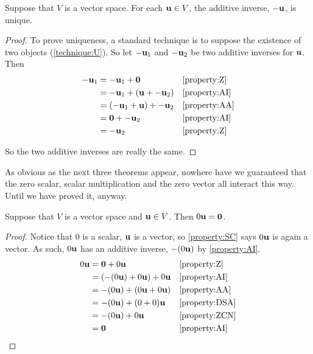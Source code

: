 \documentclass{ximera}
\begin{document}
\begin{theorem}
  \label{theorem:AIU}
  
  Suppose that $V$ is a vector space.   For each $\mathbf{u}\in V$, the additive inverse, $\mathbf{-u}$, is unique.
  
  \begin{proof}
    To prove uniqueness, a standard technique is to suppose the existence of two objects (\ref{technique:U}).  So let $\mathbf{-u}_1$ and $\mathbf{-u}_2$ be two additive inverses for $\mathbf{u}$.  Then
    \begin{align*}
      \mathbf{-u}_1&=\mathbf{-u}_1+\mathbf{0}&&\ref{property:Z}\\
                 &=\mathbf{-u}_1+(\mathbf{u}+\mathbf{-u}_2)&&\ref{property:AI}\\
                 &=(\mathbf{-u}_1+\mathbf{u})+\mathbf{-u}_2&&\ref{property:AA}\\
                 &=\mathbf{0}+\mathbf{-u}_2&&\ref{property:AI}\\
                 &=\mathbf{-u}_2&&\ref{property:Z}
    \end{align*}
    
    So the two additive inverses are really the same.
    
  \end{proof}
\end{theorem}

As obvious as the next three theorems appear, nowhere have we
guaranteed that the zero scalar, scalar multiplication and the zero
vector all interact this way.  Until we have proved it, anyway.

\begin{theorem}
  \label{theorem:ZSSM}

  Suppose that $V$ is a vector space and $\mathbf{u}\in V$.  Then $0\mathbf{u}=\mathbf{0}$.

  \begin{proof}
    Notice that $0$ is a scalar, $\mathbf{u}$ is a vector, so \ref{property:SC} says $0\mathbf{u}$ is again a vector.  As such, $0\mathbf{u}$ has an additive inverse, $-(0\mathbf{u})$ by \ref{property:AI}.
    \begin{align*}
      0\mathbf{u}
      &=\mathbf{0}+0\mathbf{u}&&\ref{property:Z}\\
      &=\left(-(0\mathbf{u}) + 0\mathbf{u}\right)+0\mathbf{u}&&\ref{property:AI}\\
      &=-(0\mathbf{u}) + \left(0\mathbf{u}+0\mathbf{u}\right)&&\ref{property:AA}\\
      &=-(0\mathbf{u}) + (0+0)\mathbf{u}&&\ref{property:DSA}\\
      &=-(0\mathbf{u}) + 0\mathbf{u}&&\ref{property:ZCN}\\
      &=\mathbf{0}&&\ref{property:AI}
    \end{align*}

  \end{proof}
\end{theorem}
\end{document}
